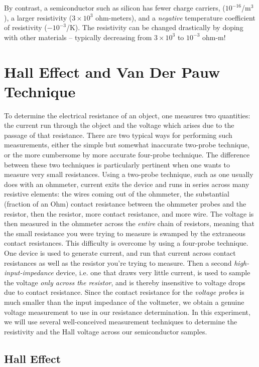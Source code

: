\documentclass{../lab}
\begin{document}
By contrast, a semiconductor such as silicon has fewer charge carriers, ($10^{-16}$/m$^3$), a larger resistivity ($3\times10^3$ ohm-meters), and a \emph{negative} temperature coefficient of resistivity ($-10^{-3}$/K). The resistivity can be changed drastically by doping with other materials – typically decreasing from $3\times10^3$ to $10^{-3}$ ohm-m!

\section{Hall Effect and Van Der Pauw Technique}

To determine the electrical resistance of an object, one measures two quantities: the current run through the object and the voltage which arises due to the passage of that resistance. There are two typical ways for performing such measurements, either the simple but somewhat inaccurate two-probe technique, or the more cumbersome by more accurate four-probe technique. The difference between these two techniques is particularly pertinent when one wants to measure very small resistances. Using a two-probe technique, such as one usually does with an ohmmeter, current exits the device and runs in series across many resistive elements: the wires coming out of the ohmmeter, the substantial (fraction of an Ohm) contact resistance between the ohmmeter probes and the resistor, then the resistor, more contact resistance, and more wire. The voltage is then measured in the ohmmeter across the \emph{entire} chain of resistors, meaning that the small resistance you were trying to measure is swamped by the extraneous contact resistances. This difficulty is overcome by using a four-probe technique. One device is used to generate current, and run that current across contact resistances as well as the resistor you're trying to measure. Then a second \emph{high-input-impedance} device, i.e. one that draws very little current, is used to sample the voltage \emph{only across the resistor}, and is thereby insensitive to voltage drops due to contact resistance. Since the contact resistance for the \emph{voltage probes} is much smaller than the input impedance of the voltmeter, we obtain a genuine voltage measurement to use in our resistance determination. In this experiment, we will use several well-conceived measurement techniques to determine the resistivity and the Hall voltage across our semiconductor samples.

\subsection{Hall Effect}
\end{document}

